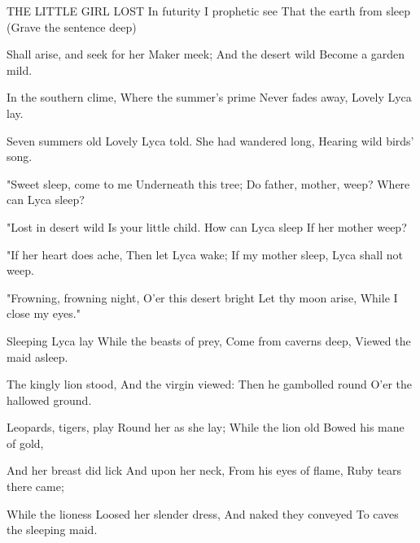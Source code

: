 THE LITTLE GIRL LOST
   In futurity
   I prophetic see
   That the earth from sleep
   (Grave the sentence deep)

   Shall arise, and seek
   for her Maker meek;
   And the desert wild
   Become a garden mild.
   
   In the southern clime,
   Where the summer's prime
   Never fades away,
   Lovely Lyca lay.
   
   Seven summers old
   Lovely Lyca told.
   She had wandered long,
   Hearing wild birds' song.
   
   "Sweet sleep, come to me
   Underneath this tree;
   Do father, mother, weep?
   Where can Lyca sleep?
   
   "Lost in desert wild
   Is your little child.
   How can Lyca sleep
   If her mother weep?
   
   "If her heart does ache,
   Then let Lyca wake;
   If my mother sleep,
   Lyca shall not weep.
   
   "Frowning, frowning night,
   O'er this desert bright
   Let thy moon arise,
   While I close my eyes."
   
   Sleeping Lyca lay
   While the beasts of prey,
   Come from caverns deep,
   Viewed the maid asleep.
   
   The kingly lion stood,
   And the virgin viewed:
   Then he gambolled round
   O'er the hallowed ground.
   
   Leopards, tigers, play
   Round her as she lay;
   While the lion old
   Bowed his mane of gold,
   
   And her breast did lick
   And upon her neck,
   From his eyes of flame,
   Ruby tears there came;
   
   While the lioness
   Loosed her slender dress,
   And naked they conveyed
   To caves the sleeping maid.